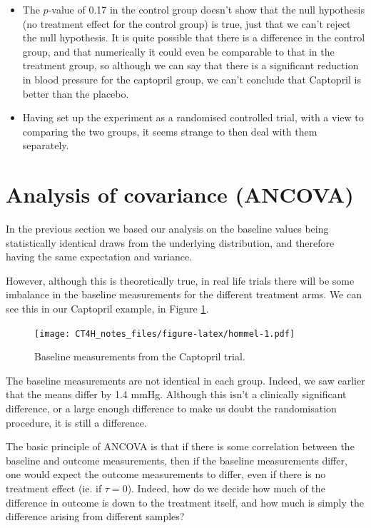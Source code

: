 \documentclass[
  openany]{book}
\providecommand{\tightlist}{%
  \setlength{\itemsep}{0pt}\setlength{\parskip}{0pt}}
\theoremstyle{definition}
\theoremstyle{definition}
\theoremstyle{definition}
\theoremstyle{definition}
\theoremstyle{remark}
\begin{document}
\begin{itemize}
\tightlist
\item
  The \(p\)-value of 0.17 in the control group doesn't show that the null hypothesis (no treatment effect for the control group) is true, just that we can't reject the null hypothesis. It is quite possible that there is a difference in the control group, and that numerically it could even be comparable to that in the treatment group, so although we can say that there is a significant reduction in blood pressure for the captopril group, we can't conclude that Captopril is better than the placebo.
\item
  Having set up the experiment as a randomised controlled trial, with a view to comparing the two groups, it seems strange to then deal with them separately.
\end{itemize}

\hypertarget{analysis-of-covariance-ancova}{%
\section{Analysis of covariance (ANCOVA)}\label{analysis-of-covariance-ancova}}

In the previous section we based our analysis on the baseline values being statistically identical draws from the underlying distribution, and therefore having the same expectation and variance.

However, although this is theoretically true, in real life trials there will be some imbalance in the baseline measurements for the different treatment arms. We can see this in our Captopril example, in Figure \ref{fig:hommel}.

\begin{figure}
\centering
\texttt{[image: CT4H\_notes\_files/figure-latex/hommel-1.pdf]}
\caption{\label{fig:hommel}Baseline measurements from the Captopril trial.}
\end{figure}

The baseline measurements are not identical in each group. Indeed, we saw earlier that the means differ by 1.4 mmHg. Although this isn't a clinically significant difference, or a large enough difference to make us doubt the randomisation procedure, it is still a difference.

The basic principle of ANCOVA is that if there is some correlation between the baseline and outcome measurements, then if the baseline measurements differ, one would expect the outcome measurements to differ, even if there is no treatment effect (ie. if \(\tau=0\)). Indeed, how do we decide how much of the difference in outcome is down to the treatment itself, and how much is simply the difference arising from different samples?
\end{document}
